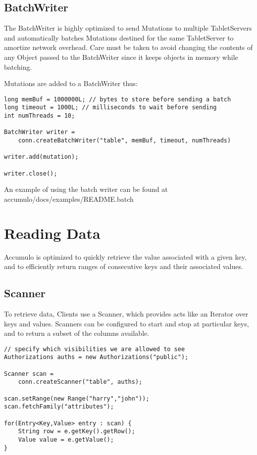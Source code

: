 \subsection{BatchWriter}
The BatchWriter is highly optimized to send Mutations to multiple TabletServers
and automatically batches Mutations destined for the same TabletServer to
amortize network overhead. Care must be taken to avoid changing the contents of
any Object passed to the BatchWriter since it keeps objects in memory while
batching.

Mutations are added to a BatchWriter thus:

\small
\begin{verbatim}
long memBuf = 1000000L; // bytes to store before sending a batch
long timeout = 1000L; // milliseconds to wait before sending
int numThreads = 10;

BatchWriter writer =
    conn.createBatchWriter("table", memBuf, timeout, numThreads)

writer.add(mutation);

writer.close();
\end{verbatim}
\normalsize

An example of using the batch writer can be found at\\
accumulo/docs/examples/README.batch

\section{Reading Data}

Accumulo is optimized to quickly retrieve the value associated with a given key, and
to efficiently return ranges of consecutive keys and their associated values.

\subsection{Scanner}

To retrieve data, Clients use a Scanner, which provides acts like an Iterator over
keys and values. Scanners can be configured to start and stop at particular keys, and
to return a subset of the columns available.

\small
\begin{verbatim}
// specify which visibilities we are allowed to see
Authorizations auths = new Authorizations("public");

Scanner scan =
    conn.createScanner("table", auths);

scan.setRange(new Range("harry","john"));
scan.fetchFamily("attributes");

for(Entry<Key,Value> entry : scan) {
    String row = e.getKey().getRow();
    Value value = e.getValue();
}
\end{verbatim}
\normalsize

